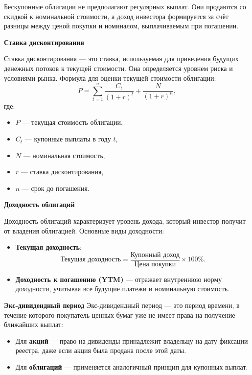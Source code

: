 Бескупонные облигации не предполагают регулярных выплат. Они продаются со скидкой к номинальной стоимости, а доход инвестора формируется за счёт разницы между ценой покупки и номиналом, выплачиваемым при погашении.

\textbf{Ставка дисконтирования}

Ставка дисконтирования --- это ставка, используемая для приведения будущих денежных потоков к текущей стоимости. Она определяется уровнем риска и условиями рынка. Формула для оценки текущей стоимости облигации:
\begin{equation}
    P = \sum_{t=1}^{n} \frac{C_t}{(1 + r)^t} + \frac{N}{(1 + r)^n},
\end{equation}
\noindent где:
\begin{itemize}
    \item $P$ --- текущая стоимость облигации,
    \item $C_t$ --- купонные выплаты в году $t$,
    \item $N$ --- номинальная стоимость,
    \item $r$ --- ставка дисконтирования,
    \item $n$ --- срок до погашения.
\end{itemize}

\textbf{Доходность облигаций}

Доходность облигаций характеризует уровень дохода, который инвестор получит от владения облигацией. Основные виды доходности:
\begin{itemize}
    \item \textbf{Текущая доходность}:
    \begin{equation}
        \text{Текущая доходность} = \frac{\text{Купонный доход}}{\text{Цена покупки}} \times 100\%.
    \end{equation}
    \item \textbf{Доходность к погашению (YTM)} --- отражает внутреннюю норму доходности, учитывая все будущие платежи и номинальную стоимость.
\end{itemize}

\textbf{Экс-дивидендный период}
Экс-дивидендный период --- это период времени, в течение которого покупатель ценных бумаг уже не имеет права на получение ближайших выплат:
\begin{itemize}
    \item Для \textbf{акций} --- право на дивиденды принадлежит владельцу на дату фиксации реестра, даже если акция была продана после этой даты.
    \item Для \textbf{облигаций} --- применяется аналогичный принцип для купонных выплат.
\end{itemize}

